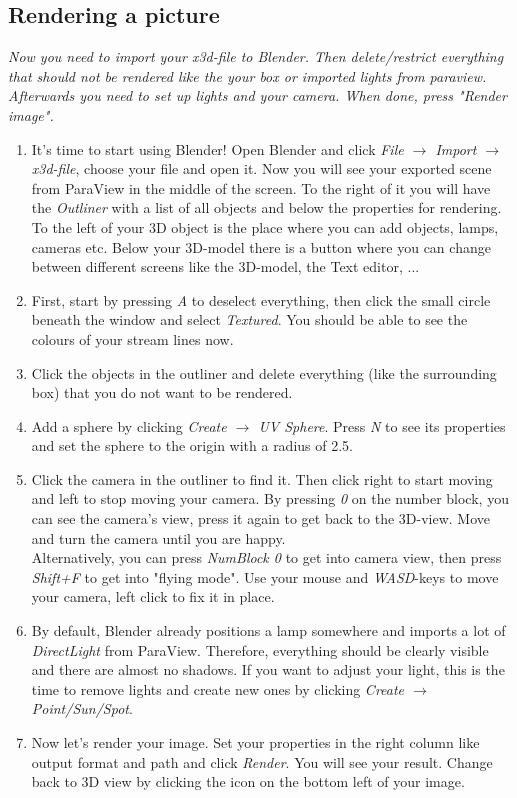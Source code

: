 \documentclass[11pt,twoside,a4paper]{fdyartcl}
\theoremstyle{myPlain}
\theoremstyle{myDefinition}
\begin{document}
\subsection{Rendering a picture}
\textit{Now you need to import your x3d-file to Blender. Then delete/restrict everything that should not be rendered like the your box or imported lights from paraview. Afterwards you need to set up lights and your camera. When done, press "Render image".}

\begin{enumerate}
	\item It's time to start using Blender! Open Blender and click \textit{File $\rightarrow$ Import $\rightarrow$ x3d-file}, choose your file and open it. Now you will see your exported scene from ParaView in the middle of the screen. To the right of it you will have the \textit{Outliner} with a list of all objects and below the properties for rendering. To the left of your 3D object is the place where you can add objects, lamps, cameras etc. Below your 3D-model there is a button where you can change between different screens like the 3D-model, the Text editor, ...
	\item First, start by pressing \textit{A} to deselect everything, then click the small circle beneath the window and select \textit{Textured}. You should be able to see the colours of your stream lines now. 
	\item Click the objects in the outliner and delete everything (like the surrounding box) that you do not want to be rendered.
	\item Add a sphere by clicking \textit{Create $\rightarrow$ UV Sphere}. Press \textit{N} to see its properties and set the sphere to the origin with a radius of 2.5.
	\item Click the camera in the outliner to find it. Then click right to start moving and left to stop moving your camera. By pressing \textit{0} on the number block, you can see the camera's view, press it again to get back to the 3D-view. Move and turn the camera until you are happy. \\
	Alternatively, you can press \textit{NumBlock 0} to get into camera view, then press \textit{Shift+F} to get into "flying mode". Use your mouse and \textit{WASD}-keys to move your camera, left click to fix it in place. 
	\item By default, Blender already positions a lamp somewhere and imports a lot of \textit{DirectLight} from ParaView. Therefore, everything should be clearly visible and there are almost no shadows. If you want to adjust your light, this is the time to remove lights and create new ones by clicking \textit{Create $\rightarrow$ Point/Sun/Spot}.
	\item Now let's render your image. Set your properties in the right column like output format and path and click \textit{Render}. You will see your result. Change back to 3D view by clicking the icon on the bottom left of your image. 
\end{enumerate}
\end{document}
